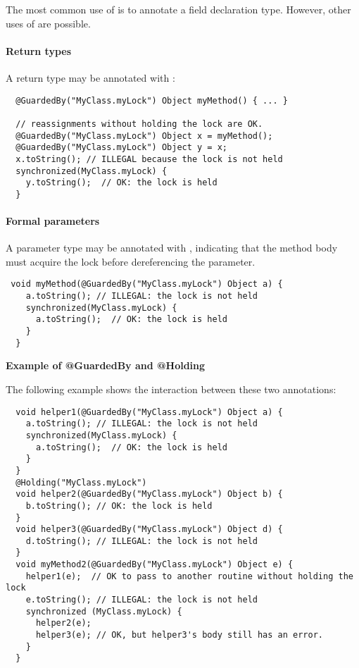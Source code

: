 The most common use of  is to annotate a field declaration
type.  However, other uses of  are possible.

\paragraph{Return types\label{lock-examples-guardedby-return}}

A return type may be annotated with :

\begin{Verbatim}
  @GuardedBy("MyClass.myLock") Object myMethod() { ... }

  // reassignments without holding the lock are OK.
  @GuardedBy("MyClass.myLock") Object x = myMethod();
  @GuardedBy("MyClass.myLock") Object y = x;
  x.toString(); // ILLEGAL because the lock is not held
  synchronized(MyClass.myLock) {
    y.toString();  // OK: the lock is held
  }
\end{Verbatim}

\paragraph{Formal parameters\label{lock-examples-guardedby-formal-parameters}}

A parameter type may be annotated with , indicating that
the method body must acquire the lock before dereferencing the parameter.

\begin{Verbatim}
 void myMethod(@GuardedBy("MyClass.myLock") Object a) {
    a.toString(); // ILLEGAL: the lock is not held
    synchronized(MyClass.myLock) {
      a.toString();  // OK: the lock is held
    }
  }
\end{Verbatim}

\textbf{Example of @GuardedBy and @Holding}

The following example shows the interaction between these two annotations:

\begin{Verbatim}
  void helper1(@GuardedBy("MyClass.myLock") Object a) {
    a.toString(); // ILLEGAL: the lock is not held
    synchronized(MyClass.myLock) {
      a.toString();  // OK: the lock is held
    }
  }
  @Holding("MyClass.myLock")
  void helper2(@GuardedBy("MyClass.myLock") Object b) {
    b.toString(); // OK: the lock is held
  }
  void helper3(@GuardedBy("MyClass.myLock") Object d) {
    d.toString(); // ILLEGAL: the lock is not held
  }
  void myMethod2(@GuardedBy("MyClass.myLock") Object e) {
    helper1(e);  // OK to pass to another routine without holding the lock
    e.toString(); // ILLEGAL: the lock is not held
    synchronized (MyClass.myLock) {
      helper2(e);
      helper3(e); // OK, but helper3's body still has an error.
    }
  }
\end{Verbatim}

